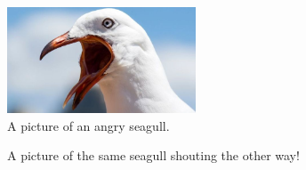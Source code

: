 \documentclass[a4paper,11pt]{article}
\begin{document}
\begin{figure}
	\caption{A picture of an angry seagull.}
	\centering
	\includegraphics[width=0.5\textwidth]{angry.jpg}
\end{figure}
\begin{figure}
	\centering
	\caption{A picture of the same seagull
		shouting the other way!}
\end{figure}

\pagebreak
\end{document}
